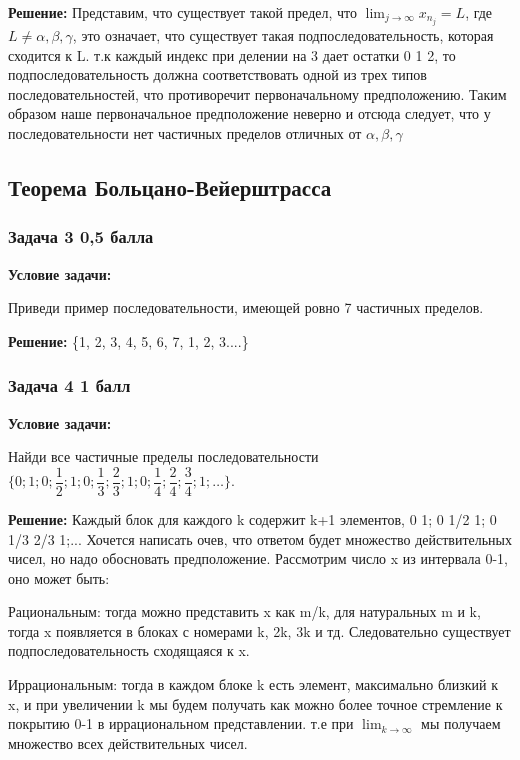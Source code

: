 \documentclass[a4paper,12pt]{article}
\begin{document}
\textbf{Решение: }
Представим, что существует такой предел, что $\lim_{j \to \infty}x_n_j = L$, где $L \ne \alpha, \beta, \gamma$, это означает, что существует такая подпоследовательность, которая сходится к L. т.к каждый индекс при делении на 3 дает остатки 0 1 2, то подпоследовательность должна соответствовать одной из трех типов последовательностей, что противоречит первоначальному предположению. Таким образом наше первоначальное предположение неверно и отсюда следует, что у последовательности нет частичных пределов отличных от $\alpha, \beta, \gamma$
\vspace{1cm}

\subsection{Теорема Больцано-Вейерштрасса}

\subsubsection{Задача 3 \hfill 0,5 балла}

\textbf{Условие задачи:}

Приведи пример последовательности, имеющей ровно 7 частичных пределов.

\vspace{1cm}
\textbf{Решение: }
\{1, 2, 3, 4, 5, 6, 7, 1, 2, 3....\}
\subsubsection{Задача 4 \hfill 1 балл}

\textbf{Условие задачи:}

Найди все частичные пределы последовательности \( \{ 0; 1; 0; \dfrac{1}{2}; 1; 0; \dfrac{1}{3}; \dfrac{2}{3}; 1; 0; \dfrac{1}{4}; \dfrac{2}{4}; \dfrac{3}{4}; 1; \dots \} \).

\textbf{Решение: }
Каждый блок для каждого k содержит k+1 элементов, 0 1; 0 1/2 1; 0 1/3 2/3 1;...
Хочется написать очев, что ответом будет множество действительных чисел, но надо обосновать предположение.
Рассмотрим число x из интервала 0-1, оно может быть:

Рациональным: тогда можно представить x как m/k, для натуральных m и k, тогда x появляется в блоках с номерами k, 2k, 3k и тд. Следовательно существует подпоследовательность сходящаяся к x.

Иррациональным: тогда в каждом блоке k есть элемент, максимально близкий к x, и при увеличении k мы будем получать как можно более точное стремление к покрытию 0-1 в иррациональном представлении. т.е при $\lim_{k \to \infty} $ мы получаем множество всех действительных чисел.  
\vspace{1cm}
\end{document}
